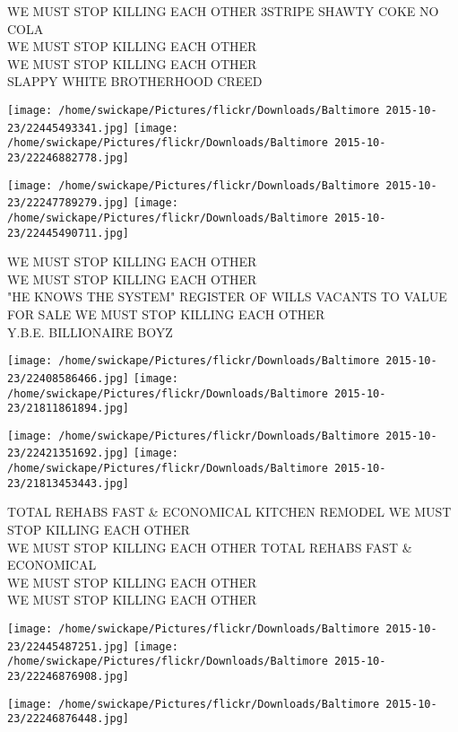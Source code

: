 \documentclass[10pt,letterpaper]{article}
\begin{document}
WE MUST STOP KILLING EACH OTHER 3STRIPE SHAWTY COKE NO COLA\\
WE MUST STOP KILLING EACH OTHER\\
WE MUST STOP KILLING EACH OTHER\\
SLAPPY WHITE BROTHERHOOD CREED
\pagebreak

\texttt{[image: /home/swickape/Pictures/flickr/Downloads/Baltimore 2015-10-23/22445493341.jpg]}
\texttt{[image: /home/swickape/Pictures/flickr/Downloads/Baltimore 2015-10-23/22246882778.jpg]}

\texttt{[image: /home/swickape/Pictures/flickr/Downloads/Baltimore 2015-10-23/22247789279.jpg]}
\texttt{[image: /home/swickape/Pictures/flickr/Downloads/Baltimore 2015-10-23/22445490711.jpg]}

WE MUST STOP KILLING EACH OTHER\\
WE MUST STOP KILLING EACH OTHER\\
"HE KNOWS THE SYSTEM" REGISTER OF WILLS VACANTS TO VALUE FOR SALE WE MUST STOP KILLING EACH OTHER\\
Y.B.E. BILLIONAIRE BOYZ
\pagebreak

\texttt{[image: /home/swickape/Pictures/flickr/Downloads/Baltimore 2015-10-23/22408586466.jpg]}
\texttt{[image: /home/swickape/Pictures/flickr/Downloads/Baltimore 2015-10-23/21811861894.jpg]}

\texttt{[image: /home/swickape/Pictures/flickr/Downloads/Baltimore 2015-10-23/22421351692.jpg]}
\texttt{[image: /home/swickape/Pictures/flickr/Downloads/Baltimore 2015-10-23/21813453443.jpg]}

TOTAL REHABS FAST \& ECONOMICAL KITCHEN REMODEL WE MUST STOP KILLING EACH OTHER\\
WE MUST STOP KILLING EACH OTHER TOTAL REHABS FAST \& ECONOMICAL\\
WE MUST STOP KILLING EACH OTHER\\
WE MUST STOP KILLING EACH OTHER
\pagebreak

\texttt{[image: /home/swickape/Pictures/flickr/Downloads/Baltimore 2015-10-23/22445487251.jpg]}
\texttt{[image: /home/swickape/Pictures/flickr/Downloads/Baltimore 2015-10-23/22246876908.jpg]}

\vspace{0.25in}
\texttt{[image: /home/swickape/Pictures/flickr/Downloads/Baltimore 2015-10-23/22246876448.jpg]}
\end{document}
